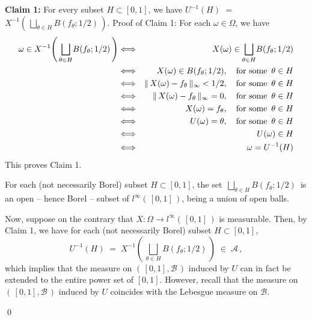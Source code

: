 \vskip 0.5cm
\noindent
\textbf{Claim 1:}\;\;
For every subset $H \subset [0,1]$, we have
$U^{-1}(H)$ $=$ $X^{-1}\!\left(\,\underset{\theta\in H}{\bigsqcup}B(f_{\theta};1/2)\,\right)$.
\vskip 0.3cm
\noindent
Proof of Claim 1:\quad
For each $\omega \in \Omega$, we have
\begin{eqnarray*}
\omega \in X^{-1}\!\left(\,\underset{\theta\in H}{\bigsqcup}B(f_{\theta};1/2)\,\right)
&\Longleftrightarrow&
	X(\omega) \in \underset{\theta\in H}{\bigsqcup}B(f_{\theta};1/2)
\\
&\Longleftrightarrow&
	X(\omega) \in B(f_{\theta};1/2),
	\quad
	\textnormal{for some \,$\theta \in H$}
\\
&\Longleftrightarrow&
	\Vert\, X(\omega) - f_{\theta}\,\Vert_{\infty} < 1/2,
	\quad
	\textnormal{for some \,$\theta \in H$}
\\
&\Longleftrightarrow&
	\Vert\, X(\omega) - f_{\theta}\,\Vert_{\infty} = 0,
	\quad
	\textnormal{for some \,$\theta \in H$}
\\
&\Longleftrightarrow&
	X(\omega) = f_{\theta},
	\quad
	\textnormal{for some \,$\theta \in H$}
\\
&\Longleftrightarrow&
	U(\omega) = \theta,
	\quad
	\textnormal{for some \,$\theta \in H$}
\\
&\Longleftrightarrow&
	U(\omega) \in H
\\
&\Longleftrightarrow&
	\omega = U^{-1}(H)
\end{eqnarray*}
This proves Claim 1.

\vskip 0.5cm
\noindent
For each (not necessarily Borel) subset $H \subset [0,1]$,
the set \,$\underset{\theta\in H}{\bigsqcup}B(f_{\theta};1/2)$\,
is an open -- hence Borel -- subset of $l^{\infty}(\,[0,1]\,)$,
being a union of open balls.

\vskip 0.3cm
\noindent
Now, suppose on the contrary that $X : \Omega \longrightarrow l^{\infty}(\,[0,1]\,)$ is measurable.
Then, by Claim 1, we have for each (not necessarily Borel) subset $H \subset [0,1]$,
\begin{equation*}
U^{-1}(H)
\;=\; X^{-1}\!\left(\,\underset{\theta\in H}{\bigsqcup}B(f_{\theta};1/2)\,\right)
\;\in\; \mathcal{A}\,,
\end{equation*}
which implies that the measure on $(\,[0,1],\mathcal{B}\,)$ induced by $U$
can in fact be extended to the entire power set of $[0,1]$.
However, recall that the measure on $(\,[0,1],\mathcal{B}\,)$ induced by $U$
coincides with the Lebesgue measure on $\mathcal{B}$.

\qed



\renewcommand{\theenumi}{\roman{enumi}}
\renewcommand{\labelenumi}{\textnormal{(\theenumi)}$\;\;$}

